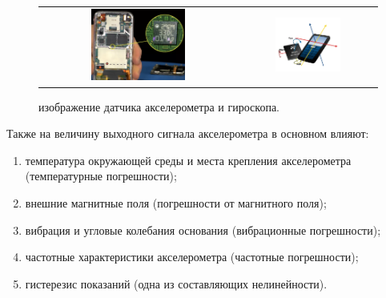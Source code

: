 \begin{figure}[H]
    \begin{center}
        \begin{tabular}{cc}
            \includegraphics[width=0.5\textwidth]{farim/im2} & 
            \includegraphics[width=0.5\textwidth]{farim/im3}
        \end{tabular}
    \end{center}
    \caption{изображение датчика акселерометра и гироскопа.}
\end{figure}
Также на величину выходного сигнала акселерометра в основном влияют:
\begin{enumerate}
    \item температура окружающей среды и места крепления акселерометра (температурные погрешности);
    \item внешние магнитные поля (погрешности от магнитного поля);
    \item вибрация и угловые колебания основания (вибрационные погрешности);
    \item частотные характеристики акселерометра (частотные погрешности);
    \item гистерезис показаний (одна из составляющих нелинейности).
\end{enumerate}



